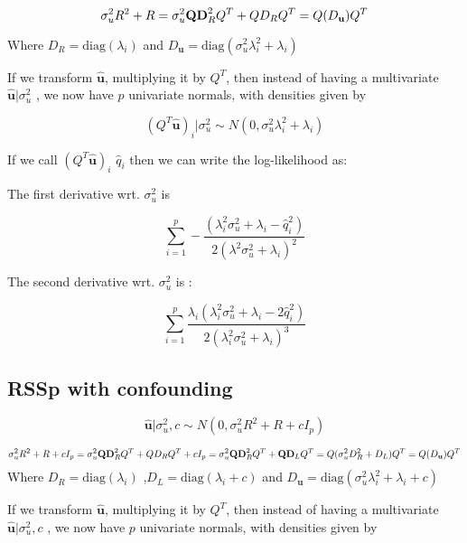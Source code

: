 {$$\sigma^2_uR^2+R \\ = \sigma_u^2\textbf{Q}\textbf{D}_R^2Q^{T} + Q D_{R} Q^{T} \\ =Q(D_\textbf{u})Q^{T}$$

Where \(D_R=\text{diag}\left(\lambda_i\right)\) and \(D_\textbf{u}=\text{diag}\left(\sigma_u^2\lambda_i^2+\lambda_i\right)\)

If we transform \(\hat{\textbf{u}}\), multiplying it by \(Q^{T}\), then instead of having a multivariate  \(\hat{\textbf{u}}|\sigma_u^2\) , we now have \(p\) univariate normals, with densities given by 

$$(Q^{T}\hat{\textbf{u}})_i|\sigma_u^2  \sim N(0,\sigma_u^2\lambda_i^2+\lambda_i)$$

If we call \((Q^{T}\hat{\textbf{u}})_i\) \(\hat{q}_i\) then we can write the log-likelihood as:


The first derivative wrt. \(\sigma_u^2\) is

$$\sum_{i=1}^p -\frac{(\lambda_i^2 \sigma_u^2 + \lambda_i - \hat{q}_i^2)}{2 (\lambda^2 \sigma_u^2 + \lambda_i)^2}$$

The second derivative wrt. \(\sigma_u^2\) is :

$$\sum_{i=1}^p  \frac{\lambda_i (\lambda_i^2 \sigma_u^2 + \lambda_i - 2 \hat{q}_i^2)}{2 (\lambda_i^2 \sigma_u^2 + \lambda_i)^3}$$

\subsection{RSSp with confounding}\label{sec:org33ff459}


$$ \hat{\textbf{u}}|\sigma_u^2,c \sim N(0,\sigma_u^2R^2+R+cI_p)$$

$$\sigma^2_uR^2+R+cI_p \\ = \sigma_u^2\textbf{Q}\textbf{D}_R^2Q^{T} + Q D_{R} Q^{T} + cI_p \\ =\sigma_u^2\textbf{Q}\textbf{D}_R^2Q^{T}+\textbf{Q}\textbf{D}_LQ^{T} \\ =Q(\sigma_u^2D^2_R + D_L)Q^{T} \\ =Q(D_\textbf{u})Q^{T}$$
Where \(D_R=\text{diag}\left(\lambda_i\right)\) ,\(D_L=\text{diag}\left(\lambda_i+c\right)\) and \(D_\textbf{u}=\text{diag}\left(\sigma_u^2\lambda_i^2+\lambda_i+c\right)\)

If we transform \(\hat{\textbf{u}}\), multiplying it by \(Q^{T}\), then instead of having a multivariate  \(\hat{\textbf{u}}|\sigma_u^2,c\) , we now have \(p\) univariate normals, with densities given by 

}
